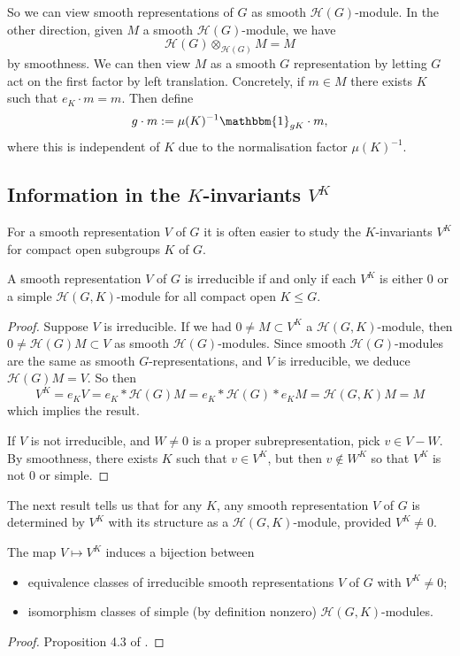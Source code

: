 So we can view smooth representations of $G$ as smooth $\mathcal H(G)$-module. In the other direction, given $M$ a smooth $\mathcal H(G)$-module, we have $$\mathcal H(G) \otimes_{\mathcal H(G)} M = M$$ by smoothness. We can then view $M$ as a smooth $G$ representation by letting $G$ act on the first factor by left translation. Concretely, if $m \in M$ there exists $K$ such that $e_K \cdot m = m$. Then define $$g \cdot m := \mu(K)^{-1} \mathbbm{1}_{gK} \cdot m,$$ where this is independent of $K$ due to the normalisation factor $\mu(K)^{-1}$.

\subsection{Information in the $K$-invariants $V^K$}
For a smooth representation $V$ of $G$ it is often easier to study the $K$-invariants $V^K$ for compact open subgroups $K$ of $G$.



\begin{lemma}\label{K inv}
    A smooth representation $V$ of $G$ is irreducible if and only if each $V^K$ is either 0 or a simple $\mathcal H(G,K)$-module for all compact open $K \leq G$.
\end{lemma}
\begin{proof}
    Suppose $V$ is irreducible. If we had $0 \neq M \subset V^K$ a $\mathcal H(G,K)$-module, then $0 \neq \mathcal H(G) M \subset V$ as smooth $\mathcal H(G)$-modules. Since smooth $\mathcal H(G)$-modules are the same as smooth $G$-representations, and $V$ is irreducible, we deduce $\mathcal H(G)M = V$. So then $$V^K = e_K V = e_K * \mathcal H(G)M = e_K * \mathcal H(G) *e_K M = \mathcal H(G,K)M=M$$ which implies the result.

    If $V$ is not irreducible, and $W \neq 0$ is a proper subrepresentation, pick $v \in V-W$. By smoothness, there exists $K$ such that $v \in V^K$, but then $v \not\in W^K$ so that $V^K$ is not 0 or simple.
\end{proof}

The next result tells us that for any $K$, any smooth representation $V$ of $G$ is determined by $V^K$ with its structure as a $\mathcal H(G,K)$-module, provided $V^K \neq 0$.

\begin{prop}\label{K bij}
    The map $V \mapsto V^K$ induces a bijection between
    \begin{itemize}
        \item equivalence classes of irreducible smooth representations $V$ of $G$ with $V^K \neq 0$;
        \item isomorphism classes of simple (by definition nonzero) $\mathcal H(G,K)$-modules.
    \end{itemize}
\end{prop}
\begin{proof}
    Proposition 4.3 of \cite{BH1}.
\end{proof}

